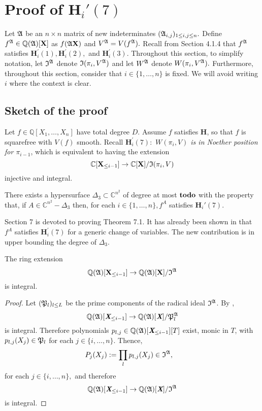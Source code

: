 \documentclass[sigconf]{acmart}
\def\td{{\bf todo}}
\def\Xb{\textit{\textbf{X}}}
\def\C{\mathbb{C}}
\def\I{\frak{I}}
\def\A{\frak{A}}
\def\fp{\frak{P}}
\begin{document}
\section{Proof of $\textbf{H}_i'(7)$}
Let $\A$ be an $n \times n$ matrix of new indeterminates $(\A_{i,j})_{1 \leq i , j \leq n}.$ Define $f^{\A} \in \mathbb{Q}(\A)[\textbf{X}]$ as $f(\A\textbf{X})$ and $V^\A=V(f^\A).$ Recall from Section 4.1.4 that $f^\A$ satisfies $\textbf{H}_i^{'}(1),\textbf{H}_i^{'}(2),$ and $\textbf{H}_i^{'}(3).$ Throughout this section, to simplify notation, let $\I^\A$ denote $\I(\pi_i,V^\A)$ and let $W^\A$ denote $W(\pi_i,V^\A).$ Furthermore, throughout this section, consider that $i \in \{1,\hdots,n\}$ is fixed. We will avoid writing $i$ where the context is clear. 
%
\subsection{Sketch of the proof}
%
Let $f \in \mathbb{Q}[X_1,\hdots,X_n]$ have total degree $D$. Assume $f$ satisfies \textbf{H}, so that $f$ is squarefree with $V(f)$ smooth. Recall $\textbf{H}_i^{'}(7):$ \textit{$W(\pi_i,V)$ is in Noether position for $\pi_{i-1}$}, which is equivalent to having the extension  
\[
\C[\textbf{X}_{\leq i-1}]\rightarrow\C[\textbf{X}]/\frak{I}(\pi_i,V)
\]
injective and  integral.
%
\begin{theorem}
There exists a hypersurface $\Delta_3 \subset \C^{n^2}$ of degree at most $\td$ with the property that, if $A \in \C^{n^2} - \Delta_3$ then, for each $i \in\{1,\hdots,n\}, f^A$ satisfies $\textbf{H}_i'(7)$.
\end{theorem}
%
Section 7 is devoted to proving Theorem 7.1. It has already been shown in \cite{EMP} that $f^A$ satisfies $\textbf{H}_i^{'}(7)$ for a generic change of variables. The new contribution is in upper bounding the degree of $\Delta_3.$
%
\begin{proposition} 
The ring extension \[\mathbb{Q}(\frak{A})[\textbf{X}_{\leq i-1}]\rightarrow\mathbb{Q}(\frak{A})[\textbf{X}]/\I^{\A}\] is integral.
\end{proposition}
%
\begin{proof}
Let $(\frak{P}_l)_{l \leq L}$ be the prime components of the radical ideal $\I^\A$. By \cite[Proposition 1]{EMP}, 
\[
\mathbb{Q}(\frak{A})[\Xb_{\leq i-1}]\rightarrow\mathbb{Q}(\frak{A})[\Xb]/\fp_l^{\A}
\] 
is integral. Therefore polynomials $p_{l,j}\in\mathbb{Q}(\frak{A})[\Xb_{\leq i-1}][T]$ exist, monic in $T$, with $p_{l,j}(X_j)\in \frak{P}_l$ for each $j\in \{i,\hdots,n\}.$ Thence, 
%
\begin{align*}
&P_{j}(X_j) := \prod_l p_{l,j}(X_j)\in\I^\A, 
\end{align*}
%
for each $j \in \{i,\hdots,n\},$ and therefore 
\[
\mathbb{Q}(\frak{A})[\Xb_{\leq i-1}]\rightarrow\mathbb{Q}(\frak{A})[\Xb]/\I^{\A}
\] 
is integral.
\end{proof}
\end{document}
